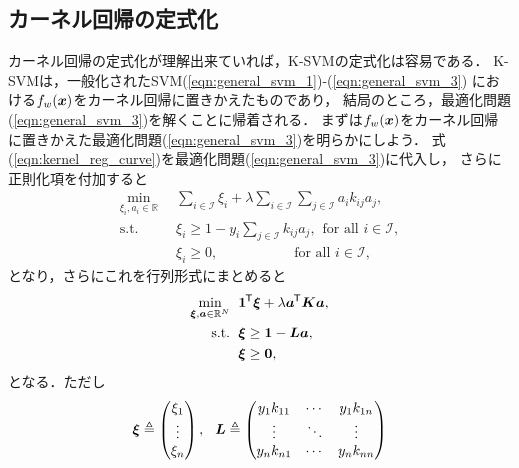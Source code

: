 %

\subsection{カーネル回帰の定式化}

カーネル回帰の定式化が理解出来ていれば，K-SVMの定式化は容易である．
K-SVMは，一般化されたSVM(\ref{eqn:general_svm_1})-(\ref{eqn:general_svm_3})
における$f_w(\boldsymbol{x})$をカーネル回帰に置きかえたものであり，
結局のところ，最適化問題(\ref{eqn:general_svm_3})を解くことに帰着される．
まずは$f_w(\boldsymbol{x})$をカーネル回帰に置きかえた最適化問題(\ref{eqn:general_svm_3})を明らかにしよう．
式(\ref{eqn:kernel_reg_curve})を最適化問題(\ref{eqn:general_svm_3})に代入し，
さらに正則化項を付加すると
\begin{equation}\begin{split}
    \min_{\xi_i, a_i \in \mathbb{R}} \hspace{6pt}& \sum_{i \in \mathcal{I}} \xi_i
    + \lambda \sum_{i \in \mathcal{I}} \sum_{j \in \mathcal{I}} a_i k_{ij} a_j, \\
    \text{s.t.} \hspace{6pt}
    & \xi_i \geq 1 - y_i \sum_{j \in \mathcal{I}} k_{ij} a_j, \hspace{ 5pt} \text{for all $i \in \mathcal{I}$}, \\
    & \xi_i \geq 0,                                           \hspace{65pt} \text{for all $i \in \mathcal{I}$},
\end{split}\end{equation}
となり，さらにこれを行列形式にまとめると
\begin{equation}\begin{split}
    \label{eqn:ksvm}
    \min_{\boldsymbol{\xi}, \boldsymbol{a} \in \mathbb{R}^N} \hspace{6pt}& \boldsymbol{1}^{\mkern-1.5mu\mathsf{T}} \boldsymbol{\xi} + \lambda \boldsymbol{a}^{\mkern-1.5mu\mathsf{T}} \boldsymbol{Ka}, \\
    \text{s.t.} \hspace{6pt}
    & \boldsymbol{\xi} \geq \boldsymbol{1} - \boldsymbol{La}, \\
    & \boldsymbol{\xi} \geq \boldsymbol{0},
\end{split}\end{equation}
となる．ただし
\begin{align}
    \boldsymbol{\xi} \triangleq
    \begin{pmatrix}
        \xi_1 \\ \vdots \\ \xi_n
    \end{pmatrix},
    \hspace{7pt}
    \boldsymbol{L} \triangleq
    \begin{pmatrix}
        y_1 k_{11} & \cdots & y_1 k_{1n} \\
        \vdots     & \ddots & \vdots     \\
        y_n k_{n1} & \cdots & y_n k_{nn}
    \end{pmatrix}
\end{align}
